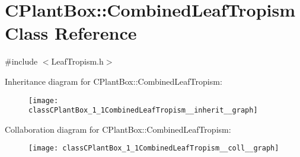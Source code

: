 \hypertarget{classCPlantBox_1_1CombinedLeafTropism}{}\section{C\+Plant\+Box\+:\+:Combined\+Leaf\+Tropism Class Reference}
\label{classCPlantBox_1_1CombinedLeafTropism}


{\ttfamily \#include $<$Leaf\+Tropism.\+h$>$}



Inheritance diagram for C\+Plant\+Box\+:\+:Combined\+Leaf\+Tropism\+:\nopagebreak
\begin{figure}[H]
\begin{center}
\leavevmode
\texttt{[image: classCPlantBox\_1\_1CombinedLeafTropism\_\_inherit\_\_graph]}
\end{center}
\end{figure}


Collaboration diagram for C\+Plant\+Box\+:\+:Combined\+Leaf\+Tropism\+:\nopagebreak
\begin{figure}[H]
\begin{center}
\leavevmode
\texttt{[image: classCPlantBox\_1\_1CombinedLeafTropism\_\_coll\_\_graph]}
\end{center}
\end{figure}
